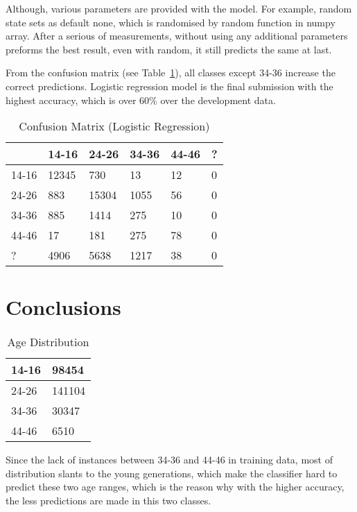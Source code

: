 \documentclass[11pt]{article}
\begin{document}
Although, various parameters are provided with the model. For example, random state sets as default none, which is randomised by random function in numpy array. After a serious of measurements, without using any additional parameters preforms the best result, even with random, it still predicts the same at last. 

From the confusion matrix (see Table~\ref{table4}), all classes except 34-36 increase the correct predictions. Logistic regression model is the final submission with the highest accuracy, which is over 60\% over the development data.

\begin{table}[h]
\centering
\begin{tabular}{|l|l|l|l|l|l|}
\hline
      & 14-16 & 24-26 & 34-36 & 44-46 & ? \\ \hline
14-16 & 12345 & 730   & 13    & 12    & 0 \\ \hline
24-26 & 883   & 15304 & 1055  & 56    & 0 \\ \hline
34-36 & 885   & 1414  & 275   & 10    & 0 \\ \hline
44-46 & 17    & 181   & 275   & 78    & 0 \\ \hline
?     & 4906  & 5638  & 1217  & 38    & 0 \\ \hline
\end{tabular}
\caption{Confusion Matrix (Logistic Regression)}
\label{table4}
\end{table}

\section{Conclusions}

\begin{table}[h]
\centering
\begin{tabular}{|l|l|}
\hline
14-16 & 98454  \\ \hline
24-26 & 141104 \\ \hline
34-36 & 30347  \\ \hline
44-46 & 6510   \\ \hline
\end{tabular}
\caption{Age Distribution}
\label{table5}
\end{table}

Since the lack of instances between 34-36 and 44-46 in training data, most of distribution slants to the young generations, which make the classifier hard to predict these two age ranges, which is the reason why with the higher accuracy, the less predictions are made in this two classes.
\end{document}
